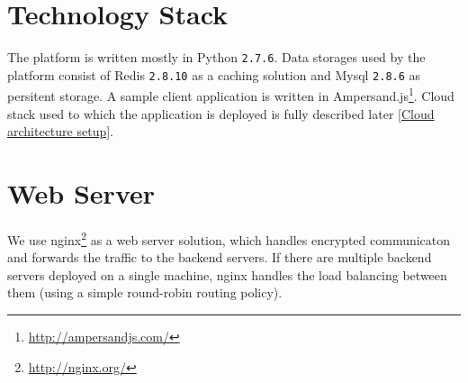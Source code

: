 \documentclass{uvamscse}
\begin{document}
\section{Technology Stack} \label{Technology Stack}

The platform is written mostly in Python \texttt{2.7.6}. Data storages used by the platform consist of Redis \texttt{2.8.10} as a caching solution and Mysql \texttt{2.8.6} as persitent storage. A sample client application is written in Ampersand.js\footnote{\url{http://ampersandjs.com/}}. Cloud stack used to which the application is deployed is fully described later \ref{Cloud architecture setup}.

\section{Web Server}

We use nginx\footnote{\url{http://nginx.org/}} as a web server solution, which handles encrypted communicaton and forwards the traffic to the backend servers. If there are multiple backend servers deployed on a single machine, nginx handles the load balancing between them (using a simple round-robin routing policy).


\end{document}
